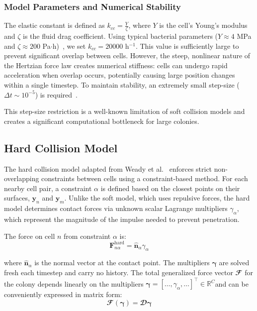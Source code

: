 \documentclass[a4paper,fleqn]{cas-dc}
\providecommand{\DIFaddtex}[1]{\highLight[diffaddbg]{#1}} %
\providecommand{\DIFaddbegin}{} %
\providecommand{\DIFaddend}{} %
\providecommand{\DIFaddtex}[1]{\texorpdfstring{\DIFaddtex{#1}}{#1}} %
\providecommand{\DIFadd}[1]{\texorpdfstring{\DIFaddtex{#1}}{#1}} %
\newcommand{\DIFaddincludegraphics}[2][]{{\color{blue}\fbox{\DIFOincludegraphics[#1]{#2}}}} %
\DeclareRobustCommand{\DIFaddbegin}{\DIFOaddbegin \let\includegraphics\DIFaddincludegraphics} %
\DeclareRobustCommand{\DIFaddend}{\DIFOaddend \let\includegraphics\DIFOincludegraphics} %
\begin{document}
\subsubsection{Model Parameters and Numerical Stability}

The elastic constant is defined as $k_{cc} = \frac{Y}{\zeta}$, where $Y$ is the cell's Young's modulus and $\zeta$ is the fluid drag coefficient. Using typical bacterial parameters ($Y \approx 4$ MPa and $\zeta \approx 200$ Pa$\cdot$h)~\cite{You2018, Blanchard2015}, we set $k_{cc} = 20000$ h$^{-1}$. This value is sufficiently large to prevent significant overlap between cells. However, the steep, nonlinear nature of the Hertzian force law creates numerical stiffness: cells can undergo rapid acceleration when overlap occurs, potentially causing large position changes within a single timestep. To maintain stability, an extremely small step-size ($\Delta t \sim 10^{-5}$) is required~\cite{Khan_2024, You2018, Blanchard2015}.
\DIFaddbegin 

\DIFaddend This step-size \DIFaddbegin \DIFadd{limit }\DIFaddend restriction is a well-known limitation of soft collision models and creates a significant computational bottleneck for large colonies.

\subsection{Hard Collision Model}

The hard collision model adapted from Weady et al.~\cite{Weady2024SM} enforces strict non-overlapping constraints between cells using a constraint-based method. For each nearby cell pair, a constraint $\alpha$ is defined based on the closest points on their surfaces, $\mathbf{y}_n$ and $\mathbf{y}_m$. Unlike the soft model, which uses repulsive forces, the hard model determines contact forces via unknown scalar Lagrange multipliers $\gamma_\alpha$, which represent the magnitude of the impulse needed to prevent penetration.

The force on cell $n$ from constraint $\alpha$ is:
\begin{equation} \label{eq:constraint_force}
    \mathbf{F}^{\text{hard}}_{n\alpha} = \hat{\mathbf{n}}_\alpha \gamma_\alpha
\end{equation}

where $\hat{\mathbf{n}}_\alpha$ is the normal vector at the contact point. The multipliers $\boldsymbol{\gamma}$ are solved fresh each timestep and carry no history. The total generalized force vector $\mathbfcal{F}$ for the colony depends linearly on the multipliers $\boldsymbol{\gamma} = [\dots, \gamma_\alpha, \dots]^\top \in \mathbb{R}^{C}$\DIFaddbegin \DIFadd{, where $C$ is the number of constraints, }\DIFaddend and can be conveniently expressed in matrix form:
\begin{equation} \label{eq:force_as_function_of_multipliers}
    \mathbfcal{F}(\boldsymbol{\gamma}) = \mathbfcal{D} \boldsymbol{\gamma}
\end{equation}
\end{document}
